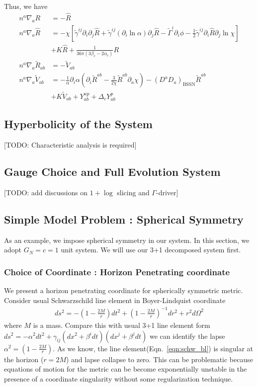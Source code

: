 \documentclass[a4paper,oneside,openany,11pt]{memoir}
\numberwithin{equation}{section} %
\newcommand{\TODO}[1]{{\color{red}[}{\color{red}TODO:} {\color{blue}#1}{\color{red}]}}
\begin{document}
Thus, we have
\begin{align}
n^a \nabla_a R &= - \hat{R}  \\
n^a \nabla_a \hat{R} &= -  \chi \left[\tilde{\gamma}^{ij} \partial_i \partial_j \hat{R} + \tilde{\gamma}^{ij} (\partial_i  \ln \alpha) \partial_j \hat{R} - \tilde{\Gamma}^i \partial_i \phi - \frac{1}{2} \tilde{\gamma}^{ij} \partial_i \hat{R} \partial_j \ln \chi \right] \nonumber \\
& + K \hat{R} + \frac{1}{36 \pi (3\beta_c - 2 \alpha_c)} R\\
n^a \nabla_a \tilde{R}_{ab} &= - \tilde{V}_{ab}  \\
n^a \nabla_a \tilde{V}_{ab} &= -  \frac{1}{\alpha} \partial_i \alpha \left(\partial_i \tilde{R}^{ab} - \frac{3}{2\chi} \tilde{R}^{ab} \partial_a \chi \right) - (D^a D_a )_{\textrm{BSSN}} \tilde{R}^{ab} \nonumber \\
& + K \tilde{V}_{ab} + Y^{np}_{ab} + \Delta_c Y^{p}_{ab}
\end{align}


\subsection{Hyperbolicity of the System}
\TODO{Characteristic analysis is required}

\subsection{Gauge Choice and Full Evolution System}
\TODO{add discussions on $1+\log$ slicing and $\Gamma$-driver}

\subsection{Simple Model Problem : Spherical Symmetry}
As an example, we impose spherical symmetry in our system. In this section, we adopt $G_N = c = 1$ unit system.
We will use our 3+1 decomposed system first. 
\subsubsection{Choice of Coordinate : Horizon Penetrating coordinate}
We present a horizon penetrating coordinate for spherically symmetric metric. Consider usual Schwarzschild line element in Boyer-Lindquist coordinate 
\begin{align}
\label{eqn:schw_bl}
ds^2 = - \left(1- \frac{2M}{r} \right) dt^2 + \left(1- \frac{2M}{r} \right)^{-1} dr^2 + r^2 d\Omega^2 
\end{align}
where $M$ is a mass. Compare this with usual 3+1 line element form $ds^2 = - \alpha^2 dt^2 + \gamma_{ij} ( dx^2 + \beta^i dt)(dx^j + \beta^j dt)$ we can identify the lapse $\alpha^2 = \left(1- \frac{2M}{r} \right)$. As we know, the line element(Eqn.~\ref{eqn:schw_bl}) is singular at the horizon ($r=2M$) and lapse collapse to zero. This can be problematic because equations of motion for the metric can be become exponentially unstable in the presence of a coordinate singularity without some regularization technique.
\end{document}

